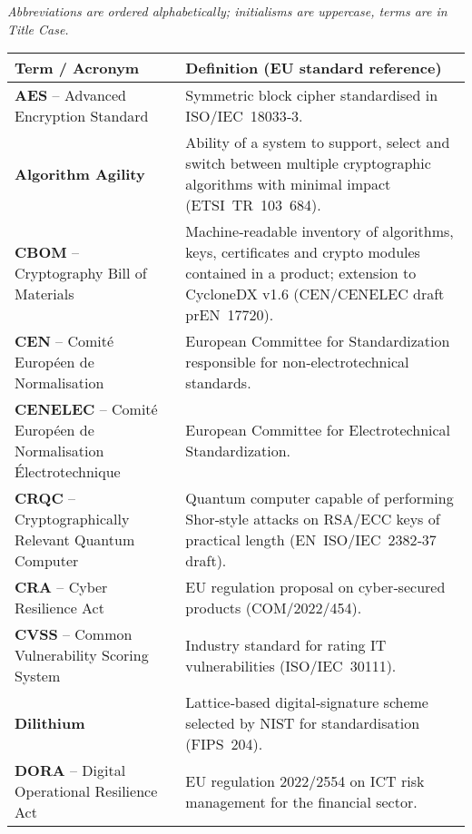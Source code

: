 \documentclass[
  english,
]{article}
\begin{document}
\emph{Abbreviations are ordered alphabetically; initialisms are
uppercase, terms are in Title Case.}

\begin{longtable}[]{@{}
  >{\raggedright\arraybackslash}p{}
  >{\raggedright\arraybackslash}p{}@{}}
\toprule\noalign{}
\begin{minipage}[b]{\linewidth}\raggedright
Term / Acronym
\end{minipage} & \begin{minipage}[b]{\linewidth}\raggedright
Definition (EU standard reference)
\end{minipage} \\
\midrule\noalign{}
\endhead
\bottomrule\noalign{}
\endlastfoot
\textbf{AES} -- Advanced Encryption Standard & Symmetric block cipher
standardised in ISO/IEC~18033‑3. \\
\textbf{Algorithm Agility} & Ability of a system to support, select and
switch between multiple cryptographic algorithms with minimal impact
(ETSI~TR~103~684). \\
\textbf{CBOM} -- Cryptography Bill of Materials & Machine‑readable
inventory of algorithms, keys, certificates and crypto modules contained
in a product; extension to CycloneDX v1.6 (CEN/CENELEC draft
prEN~17720). \\
\textbf{CEN} -- Comité Européen de Normalisation & European Committee
for Standardization responsible for non‑electrotechnical standards. \\
\textbf{CENELEC} -- Comité Européen de Normalisation Électrotechnique &
European Committee for Electrotechnical Standardization. \\
\textbf{CRQC} -- Cryptographically Relevant Quantum Computer & Quantum
computer capable of performing Shor‑style attacks on RSA/ECC keys of
practical length (EN~ISO/IEC~2382‑37 draft). \\
\textbf{CRA} -- Cyber Resilience Act & EU regulation proposal on
cyber‑secured products (COM/2022/454). \\
\textbf{CVSS} -- Common Vulnerability Scoring System & Industry standard
for rating IT vulnerabilities (ISO/IEC~30111). \\
\textbf{Dilithium} & Lattice‑based digital‑signature scheme selected by
NIST for standardisation (FIPS~204). \\
\textbf{DORA} -- Digital Operational Resilience Act & EU regulation
2022/2554 on ICT risk management for the financial sector. \\

\end{longtable}
\end{document}
